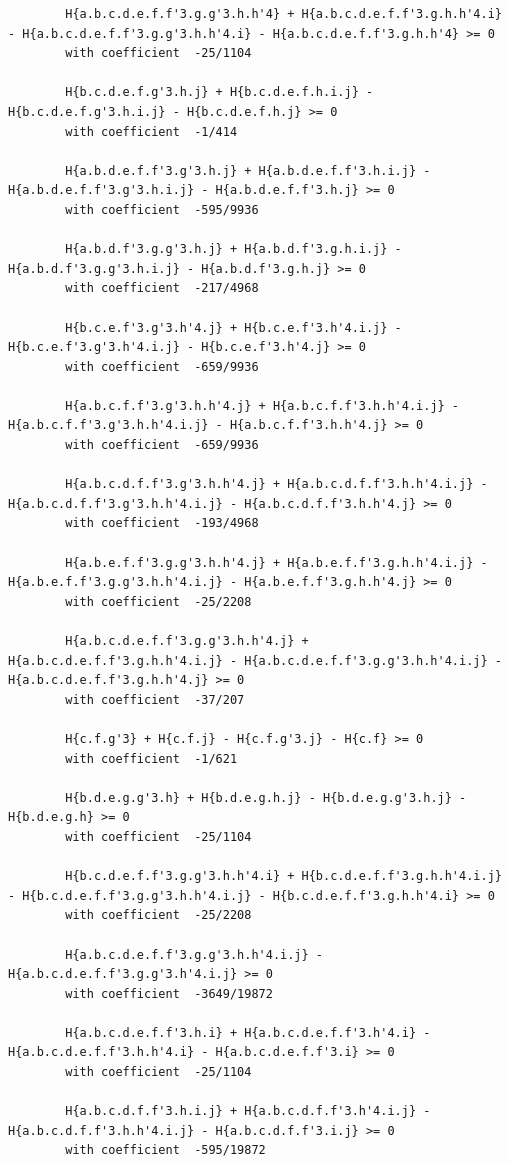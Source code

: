 \documentclass[11pt, a4paper]{kybernetika}
\begin{document}
\begin{verbatim}
		H{a.b.c.d.e.f.f'3.g.g'3.h.h'4} + H{a.b.c.d.e.f.f'3.g.h.h'4.i} - H{a.b.c.d.e.f.f'3.g.g'3.h.h'4.i} - H{a.b.c.d.e.f.f'3.g.h.h'4} >= 0
		with coefficient  -25/1104
		
		H{b.c.d.e.f.g'3.h.j} + H{b.c.d.e.f.h.i.j} - H{b.c.d.e.f.g'3.h.i.j} - H{b.c.d.e.f.h.j} >= 0
		with coefficient  -1/414
		
		H{a.b.d.e.f.f'3.g'3.h.j} + H{a.b.d.e.f.f'3.h.i.j} - H{a.b.d.e.f.f'3.g'3.h.i.j} - H{a.b.d.e.f.f'3.h.j} >= 0
		with coefficient  -595/9936
		
		H{a.b.d.f'3.g.g'3.h.j} + H{a.b.d.f'3.g.h.i.j} - H{a.b.d.f'3.g.g'3.h.i.j} - H{a.b.d.f'3.g.h.j} >= 0
		with coefficient  -217/4968
		
		H{b.c.e.f'3.g'3.h'4.j} + H{b.c.e.f'3.h'4.i.j} - H{b.c.e.f'3.g'3.h'4.i.j} - H{b.c.e.f'3.h'4.j} >= 0
		with coefficient  -659/9936
		
		H{a.b.c.f.f'3.g'3.h.h'4.j} + H{a.b.c.f.f'3.h.h'4.i.j} - H{a.b.c.f.f'3.g'3.h.h'4.i.j} - H{a.b.c.f.f'3.h.h'4.j} >= 0
		with coefficient  -659/9936
		
		H{a.b.c.d.f.f'3.g'3.h.h'4.j} + H{a.b.c.d.f.f'3.h.h'4.i.j} - H{a.b.c.d.f.f'3.g'3.h.h'4.i.j} - H{a.b.c.d.f.f'3.h.h'4.j} >= 0
		with coefficient  -193/4968
		
		H{a.b.e.f.f'3.g.g'3.h.h'4.j} + H{a.b.e.f.f'3.g.h.h'4.i.j} - H{a.b.e.f.f'3.g.g'3.h.h'4.i.j} - H{a.b.e.f.f'3.g.h.h'4.j} >= 0
		with coefficient  -25/2208
		
		H{a.b.c.d.e.f.f'3.g.g'3.h.h'4.j} + H{a.b.c.d.e.f.f'3.g.h.h'4.i.j} - H{a.b.c.d.e.f.f'3.g.g'3.h.h'4.i.j} - H{a.b.c.d.e.f.f'3.g.h.h'4.j} >= 0
		with coefficient  -37/207
		
		H{c.f.g'3} + H{c.f.j} - H{c.f.g'3.j} - H{c.f} >= 0
		with coefficient  -1/621
		
		H{b.d.e.g.g'3.h} + H{b.d.e.g.h.j} - H{b.d.e.g.g'3.h.j} - H{b.d.e.g.h} >= 0
		with coefficient  -25/1104
		
		H{b.c.d.e.f.f'3.g.g'3.h.h'4.i} + H{b.c.d.e.f.f'3.g.h.h'4.i.j} - H{b.c.d.e.f.f'3.g.g'3.h.h'4.i.j} - H{b.c.d.e.f.f'3.g.h.h'4.i} >= 0
		with coefficient  -25/2208
		
		H{a.b.c.d.e.f.f'3.g.g'3.h.h'4.i.j} - H{a.b.c.d.e.f.f'3.g.g'3.h'4.i.j} >= 0
		with coefficient  -3649/19872
		
		H{a.b.c.d.e.f.f'3.h.i} + H{a.b.c.d.e.f.f'3.h'4.i} - H{a.b.c.d.e.f.f'3.h.h'4.i} - H{a.b.c.d.e.f.f'3.i} >= 0
		with coefficient  -25/1104
		
		H{a.b.c.d.f.f'3.h.i.j} + H{a.b.c.d.f.f'3.h'4.i.j} - H{a.b.c.d.f.f'3.h.h'4.i.j} - H{a.b.c.d.f.f'3.i.j} >= 0
		with coefficient  -595/19872
		

\end{verbatim}
\end{document}

